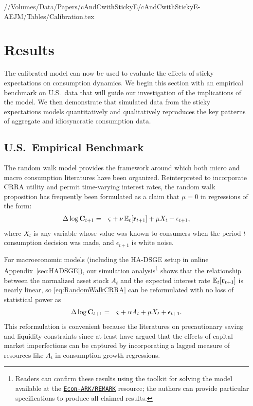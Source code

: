 \documentclass[titlepage]{./econtex}
\begin{document}
//Volumes/Data/Papers/cAndCwithStickyE/cAndCwithStickyE-AEJM/Tables/Calibration.tex


\section{Results}\label{sec:Results}

The calibrated model can now be used to evaluate the effects of sticky expectations on consumption dynamics.  We begin this section with an empirical benchmark on U.S.\ data that will guide our investigation of the implications of the model.  We then demonstrate that simulated data from the sticky expectations models quantitatively and qualitatively reproduces the key patterns of aggregate and idiosyncratic consumption data.

\subsection{U.S.\ Empirical Benchmark}
\label{sec:EmpBenchmark}

The random walk model provides the framework around which both micro and macro consumption literatures have been organized.  Reinterpreted to incorporate CRRA utility and permit time-varying interest rates, the random walk proposition has frequently been formulated as a claim that $\mu=0$ in regressions of the form:
\begin{eqnarray}
  \label{eq:RandomWalkCRRA}
  \Delta \log \mathbf{C}_{t+1} & = & \varsigma+\nu \operatorname{\mathbb{E}}_{t}[\mathbf{r}_{t+1}]+\mu X_{t}+\epsilon_{t+1},
\end{eqnarray}
where $X_{t}$ is any variable whose value was known to consumers
when the period-$t$ consumption decision was made, and $\epsilon_{t+1}$
is white noise.

For macroeconomic models (including the HA-DSGE setup in online Appendix~\ref{sec:HADSGE}), our simulation analysis\footnote{Readers can confirm these results using the toolkit for solving the model available at the \href{https://github.com/econ-ark/REMARK/tree/master/REMARKs/cAndCwithStickyE}{\texttt{Econ-ARK/REMARK}} resource; the authors can provide particular specifications to produce all claimed results.}
shows that the relationship between the normalized asset stock $A_{t}$ and the expected interest rate $\operatorname{\mathbb{E}}_{t}[\mathbf{r}_{t+1}]$ is nearly linear, so \eqref{eq:RandomWalkCRRA} can be reformulated with no loss of statistical power as
\begin{eqnarray*}
  \label{eq:RandomWalkAForm}
  \Delta \log \mathbf{C}_{t+1} & = & \varsigma+\alpha A_{t}+\mu X_{t}+\epsilon_{t+1}.
\end{eqnarray*}
This reformulation is convenient because the literatures on precautionary saving and liquidity constraints since at least \cite{zeldes:jpe,zeldesStochastic} have argued that the effects of capital market imperfections can be captured by incorporating a lagged measure of resources like $A_{t}$ in consumption growth regressions.
\end{document}
